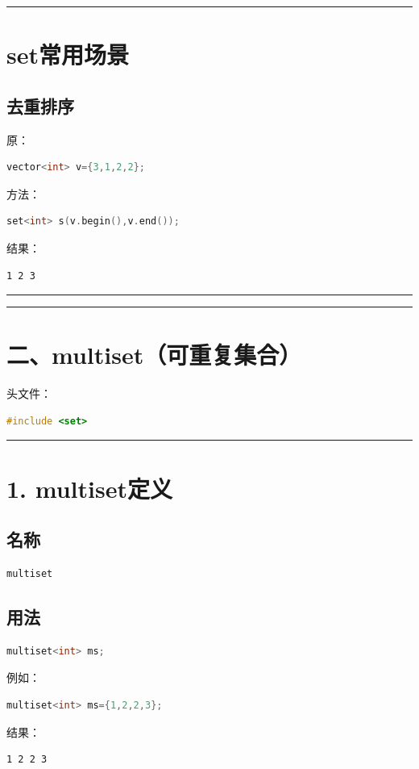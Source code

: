 \documentclass[9pt,twocolumn]{extarticle}
\begin{document}
\noindent\rule{\linewidth}{0.4pt}

\section{set常用场景}

\subsection{去重排序}
原：
\begin{lstlisting}[language=C++]
vector<int> v={3,1,2,2};
\end{lstlisting}
方法：
\begin{lstlisting}[language=C++]
set<int> s(v.begin(),v.end());
\end{lstlisting}
结果：
\begin{lstlisting}
1 2 3
\end{lstlisting}

\noindent\rule{\linewidth}{0.4pt}
\noindent\rule{\linewidth}{0.4pt}

\section{二、multiset（可重复集合）}

头文件：
\begin{lstlisting}[language=C++]
#include <set>
\end{lstlisting}

\noindent\rule{\linewidth}{0.4pt}

\section{1. multiset定义}

\subsection{名称}
\begin{lstlisting}[language=C++]
multiset
\end{lstlisting}

\subsection{用法}
\begin{lstlisting}[language=C++]
multiset<int> ms;
\end{lstlisting}
例如：
\begin{lstlisting}[language=C++]
multiset<int> ms={1,2,2,3};
\end{lstlisting}
结果：
\begin{lstlisting}
1 2 2 3
\end{lstlisting}
\end{document}
